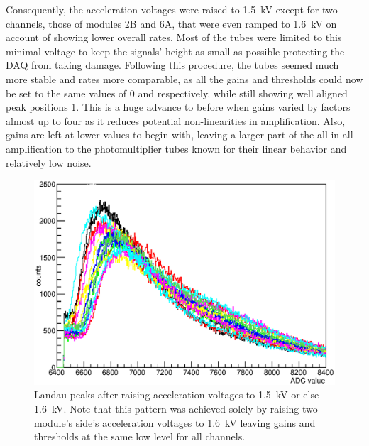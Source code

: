 	Consequently, the acceleration voltages were raised to \SI{1.5}{\kilo\volt} except for two channels, those of modules 2B and 6A, that were even ramped to \SI{1.6}{\kilo\volt} on account of showing lower overall rates.
	Most of the tubes were limited to this minimal voltage to keep the signals' height as small as possible protecting the DAQ from taking damage. Following this procedure, the tubes seemed much more stable and rates more comparable, as all the gains and thresholds could now be set to the same values of \SI{0}{}  and respectively, while still showing well aligned peak positions \ref{fig:allPeaksAfter}. This is a huge advance to before when gains varied by factors almost up to four as it reduces potential non-linearities in amplification. Also, gains are left at lower values to begin with, leaving a larger part of the all in all amplification to the photomultiplier tubes known for their linear behavior and relatively low noise.
  
	\begin{figure}
		\centering
		\includegraphics[width = 0.9 \textwidth]{graphics/setup/LandauPeaksRun1097_new.eps}
		\caption[Landau peak \SI{1500}{\volt} acceleration voltage]{Landau peaks after raising acceleration voltages to \SI{1.5}{\kilo\volt} or else \SI{1.6}{\kilo\volt}. Note that this pattern was achieved solely by raising two module's side's acceleration voltages to \SI{1.6}{\kilo\volt} leaving gains and thresholds at the same low level for all channels. }
		\label{fig:allPeaksAfter}
	\end{figure}
	
	

